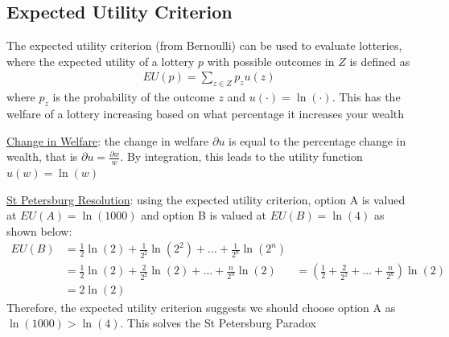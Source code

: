 \documentclass{article}
\begin{document}
\subsection{Expected Utility Criterion}
The expected utility criterion (from Bernoulli) can be used to evaluate lotteries, where the expected utility of a lottery $p$ with possible outcomes in $Z$ is defined as
\begin{gather*}
  EU(p) = \sum_{z \in Z} p_{z}u(z)
\end{gather*}
where $p_{z}$ is the probability of the outcome $z$ and $u(\cdot) = \ln (\cdot)$. This has the welfare of a lottery increasing based on what percentage it increases your wealth
\par \vspace{0.3em}
  \underline{Change in Welfare}: the change in welfare $\partial u$ is equal to the percentage change in wealth, that is $\partial u = \tfrac{\partial w}{w}$. By integration, this leads to the utility function $u(w) = \ln (w)$
  \par
  \underline{St Petersburg Resolution}: using the expected utility criterion, option A is valued at $EU(A) = \ln(1000)$ and option B is valued at $EU(B) = \ln (4)$ as shown below:
  \begin{align*}
    EU(B) &= \frac{1}{2} \ln(2) + \frac{1}{2^{2}} \ln (2^{2}) + \dots + \frac{1}{2^{n}} \ln (2^{n}) \\
    &= \frac{1}{2} \ln(2) + \frac{2}{2^{2}} \ln(2) + \dots + \frac{n}{2^{n}} \ln (2)
    &= (\frac{1}{2} + \frac{2}{2^{2}} + \dots + \frac{n}{2^{n}}) \ln(2) \\
    &= 2 \ln(2)
  \end{align*}
  Therefore, the expected utility criterion suggests we should choose option A as $\ln (1000) > \ln(4)$. This solves the St Petersburg Paradox
  \par
\vspace{6mm}
\end{document}
